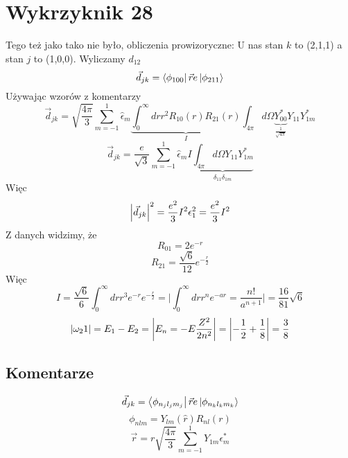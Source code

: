 \documentclass[a4paper,12pt]{article}
\begin{document}
\section{Wykrzyknik 28}
Tego też jako tako nie było, obliczenia prowizoryczne:
U nas stan $k$ to (2,1,1) a stan $j$ to (1,0,0).
Wyliczamy $d_{12}$
\begin{equation*}
  \vec{d}_{jk} = \bra{\phi_{100}} \vec{r}e \ket{\phi_{211}}
\end{equation*}
Używając wzorów z komentarzy
\begin{equation*}
  \vec{d}_{jk} = \sqrt{\frac{4\pi}{3}} \sum_{m=-1}^1 \hat{\epsilon}_m  
  \underbrace{\int_0^\infty dr r^2 R_{10}(r) R_{21}(r)}_{I} \int_{4\pi} d\Omega
  \underbrace{Y_{00}^*}_{\frac{1}{\sqrt{4\pi}}}Y_{11} 
  Y_{1m}^* 
\end{equation*}
\begin{equation*}
  \vec{d}_{jk} = \frac{e}{\sqrt{3}}\sum_{m=-1}^1 \hat{\epsilon}_m I
  \underbrace{\int_{4\pi} d\Omega Y_{11} Y_{1m}^*}_{\delta_{11} \delta_{1m}}
\end{equation*}
Więc
\begin{equation*}
  \abs{\vec{d}_{jk}}^2 = \frac{e^2}{3} I^2 \epsilon_1^2 = \frac{e^2}{3} I^2 
\end{equation*}
Z danych widzimy, że 
\begin{equation*}
  R_{01} = 2e^{-r}
\end{equation*}
\begin{equation*}
  R_{21} = \frac{\sqrt{6}}{12}e^{-\frac{r}{2}}
\end{equation*}
Więc
\begin{equation*}
  I = \frac{\sqrt{6}}{6} \int_0^\infty dr r^3 e^{-r} e^{-\frac{r}{2}} = \bigg
  \vert \int_0^\infty dr r^n e^{-ar} = \frac{n!}{a^{n+1}} \bigg \vert =
  \frac{16}{81} \sqrt{6}
\end{equation*}
\begin{equation*}
  \abs{\omega_21} = E_1 - E_2 = \bigg \vert E_n = -E \frac{Z^2}{2n^2} \bigg
  \vert = \abs{- \frac{1}{2} + \frac{1}{8}} = \frac{3}{8}
\end{equation*}

\subsection{Komentarze}
\begin{equation*}
  \vec{d}_{jk} = \bra{\phi_{n_j l_j m_j}} \vec{r}e \ket{ \phi_{n_k l_k m_k}}
\end{equation*}
\begin{equation*}
  \phi_{nlm} = Y_{lm} (\hat{r}) R_{nl} (r)
\end{equation*}
\begin{equation*}
  \vec{r} = r \sqrt{\frac{4\pi}{3}} \sum_{m=-1}^1 Y_{1m} \epsilon_{m}^*
\end{equation*}
\end{document}
